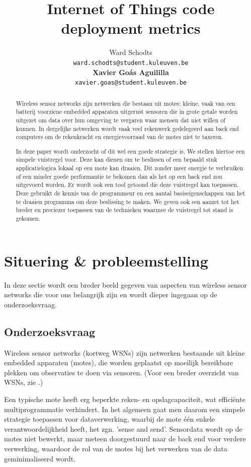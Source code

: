 \documentclass[11pt]{article}
\title{Internet of Things code deployment metrics}
\author{
  Ward Schodts\\
  \texttt{ward.schodts@student.kuleuven.be}
  \\[3ex]
  \textbf{Xavier Go\'as Aguililla}\\
  \texttt{xavier.goas@student.kuleuven.be}
}
\begin{document}
\maketitle

\begin{abstract}
Wireless sensor networks zijn netwerken die bestaan uit motes: kleine, vaak van
een batterij voorziene embedded apparaten uitgerust sensoren die in grote
getale worden uitgezet om data over hun omgeving te vergaren waar mensen dat
niet willen of kunnen. In dergelijke netwerken wordt vaak veel rekenwerk
gedelegeerd aan back end computers om de rekenkracht en energievoorraad van de
motes niet te taxeren. 

In deze paper wordt onderzocht of dit wel een goede strategie is. We stellen
hiertoe een simpele vuistregel voor. Deze kan dienen om te beslissen of een
bepaald stuk applicatielogica lokaal op een mote kan draaien. Dit zonder meer
energie te verbruiken of een minder goede performantie te bekomen dan als het op een back end zou uitgevoerd worden. Er wordt ook een tool getoond die deze vuistregel
kan toepassen. Deze gebruikt de kennis van de programmeur en een aantal
basiseigenschappen van het te draaien programma om deze beslissing te maken. We
geven ook een aanzet tot het breder en preciezer toepassen van de technieken
waarmee de vuistregel tot stand is gekomen.
  
\end{abstract}

\section{Situering \& probleemstelling}

In deze sectie wordt een breder beeld gegeven van aspecten van wireless
sensor networks die voor ons belangrijk zijn en wordt dieper ingegaan op de
onderzoeksvraag.

\subsection{Onderzoeksvraag}

Wireless sensor networks (kortweg WSNs) zijn netwerken bestaande uit kleine
embedded apparaten (motes), die worden geplaatst op moeilijk bereikbare plekken
om observaties te doen via sensoren. (Voor een breder overzicht van
WSNs, zie \cite{akyildiz2002wireless}.)

Een typische mote heeft erg beperkte reken- en opslagcapaciteit, wat
effici\"ente multiprogrammatie verhindert. In het algemeen gaat men daarom een
simpele strategie toepassen voor dataverwerking, waarbij de mote \'e\'en enkele
verantwoordelijkheid heeft, het zgn. 'sense and send'. Sensordata wordt op de
motes niet bewerkt, maar meteen doorgestuurd naar de back end voor verdere
verwerking, waardoor de rol van de motes bij het verwerken van de data
geminimaliseerd wordt.
\end{document}
